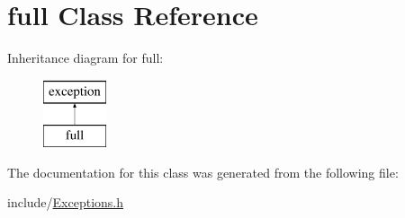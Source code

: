 \hypertarget{classfull}{}\section{full Class Reference}
\label{classfull}
Inheritance diagram for full\+:\begin{figure}[H]
\begin{center}
\leavevmode
\includegraphics[height=2.000000cm]{classfull}
\end{center}
\end{figure}


The documentation for this class was generated from the following file\+:\begin{DoxyCompactItemize}
\item 
include/\hyperlink{_exceptions_8h}{Exceptions.\+h}\end{DoxyCompactItemize}
